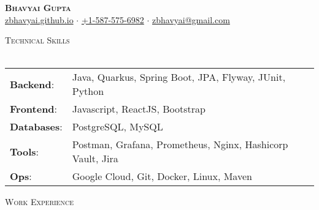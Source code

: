 \documentclass[a4paper]{article}
\newcommand{\lineunder} {
    \vspace*{-8pt} \\
    \hspace*{-18pt} \hrulefill \\
}
\newcommand{\header} [1] {
    \vspace*{5pt}
    {\hspace*{-18pt}\vspace*{6pt} \large\textsc{#1}}
    \vspace*{-6pt} \lineunder
}
\begin{document}
\vspace*{-40pt}


\vspace*{-10pt}
\begin{center}
    \textbf{\Huge \scshape {Bhavyai Gupta}}\\
    \href{https://zbhavyai.github.io}{zbhavyai.github.io} $\cdot$ \href{tel:+15875756982}{+1-587-575-6982} $\cdot$ \href{mailto:zbhavyai@gmail.com}{zbhavyai@gmail.com} \\
\end{center}


\header{Technical Skills}

\begin{tabular}{ l l }
    \textbf{Backend}:   & Java, Quarkus, Spring Boot, JPA, Flyway, JUnit, Python                        \\
    \textbf{Frontend}:  & Javascript, ReactJS, Bootstrap                                                \\
    \textbf{Databases}: & PostgreSQL, MySQL                                                             \\
    \textbf{Tools}:     & Postman, Grafana, Prometheus, Nginx, Hashicorp Vault, Jira                    \\
    \textbf{Ops}:       & Google Cloud, Git, Docker, Linux, Maven                                       \\
\end{tabular}
\vspace{2mm}


\header{Work Experience}
\end{document}
